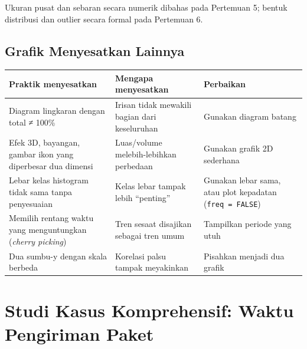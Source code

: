\documentclass[
  indonesian,
  letterpaper,
]{book}
\newcounter{none} %
\begin{document}
Ukuran pusat dan sebaran secara numerik dibahas pada Pertemuan 5; bentuk
distribusi dan outlier secara formal pada Pertemuan 6.

\subsection{Grafik Menyesatkan
Lainnya}\label{grafik-menyesatkan-lainnya}

{\def\LTcaptype{none} %
\begin{longtable}[]{@{}
  >{\raggedright\arraybackslash}p{}
  >{\raggedright\arraybackslash}p{}
  >{\raggedright\arraybackslash}p{}@{}}
\toprule\noalign{}
\begin{minipage}[b]{\linewidth}\raggedright
Praktik menyesatkan
\end{minipage} & \begin{minipage}[b]{\linewidth}\raggedright
Mengapa menyesatkan
\end{minipage} & \begin{minipage}[b]{\linewidth}\raggedright
Perbaikan
\end{minipage} \\
\midrule\noalign{}
\endhead
\bottomrule\noalign{}
\endlastfoot
Diagram lingkaran dengan total ≠ 100\% & Irisan tidak mewakili bagian
dari keseluruhan & Gunakan diagram batang \\
Efek 3D, bayangan, gambar ikon yang diperbesar dua dimensi & Luas/volume
melebih-lebihkan perbedaan & Gunakan grafik 2D sederhana \\
Lebar kelas histogram tidak sama tanpa penyesuaian & Kelas lebar tampak
lebih ``penting'' & Gunakan lebar sama, atau plot kepadatan
(\texttt{freq\ =\ FALSE}) \\
Memilih rentang waktu yang menguntungkan (\emph{cherry picking}) & Tren
sesaat disajikan sebagai tren umum & Tampilkan periode yang utuh \\
Dua sumbu-y dengan skala berbeda & Korelasi palsu tampak meyakinkan &
Pisahkan menjadi dua grafik \\
\end{longtable}
}

\section{Studi Kasus Komprehensif: Waktu Pengiriman
Paket}\label{studi-kasus-komprehensif-waktu-pengiriman-paket}
\end{document}
